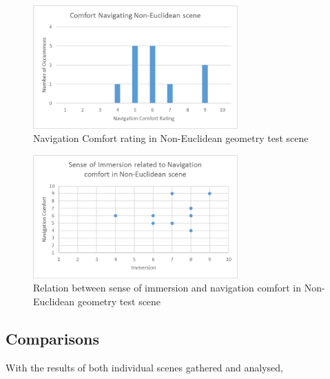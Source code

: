 			\begin{figure}[H]
				\includegraphics[width=0.7\textwidth]{Images/NE_Comfort}
				\centering
				\caption{Navigation Comfort rating in Non-Euclidean geometry test scene}
				\label{exp:fig:ne_comfort}
			\end{figure}

			\begin{figure}[H]
				\includegraphics[width=0.7\textwidth]{Images/NE_Relation}
				\centering
				\caption{Relation between sense of immersion and navigation comfort in Non-Euclidean geometry test scene}
				\label{exp:fig:ne_relation}
			\end{figure}

		\subsection{Comparisons}
		\label{exp:exp:comp}

			With the results of both individual scenes gathered and analysed, 


